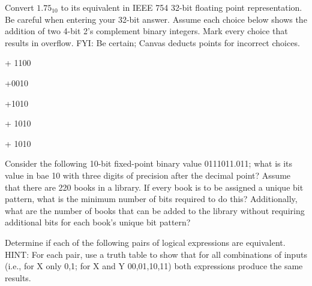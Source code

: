 \documentclass[letterpaper]{exam}
\begin{document}
\begin{questions}
       \question Convert $1.75_{10}$ to its equivalent in IEEE 754 32-bit floating point representation. Be careful when entering your 32-bit answer. 
       \question Assume each choice below shows the addition of two 4-bit 2's complement binary integers. Mark every choice that results in overflow. FYI: Be certain; Canvas deducts points for incorrect choices. 
       \begin{checkboxes}
            
             + 1100

            +0010

            +1010

             + 1010
            
             + 1010 
            
            
       \end{checkboxes}
       \question Consider the following 10-bit fixed-point binary value 0111011.011; what is its value in bae 10 with three digits of precision after the decimal point?
       \question Assume that there are 220 books in a library. If every book is to be assigned a unique bit pattern, what is the minimum number of bits required to do this? Additionally, what are the number of books that can be added to the library without requiring additional bits for each book's unique bit pattern? 
       
       \question Determine if each of the following pairs of logical expressions are equivalent. HINT: For each pair, use a truth table to show that for all combinations of inputs (i.e., for X only 0,1; for X and Y 00,01,10,11) both expressions produce the same results. 
       \begin{parts}

\end{parts}
\end{questions}
\end{document}
